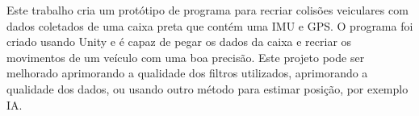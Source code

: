 Este trabalho cria um protótipo de programa para recriar colisões veiculares com dados coletados de uma caixa preta que contém uma IMU e GPS. O programa foi criado usando Unity e é capaz de pegar os dados da caixa e recriar os movimentos de um veículo com uma boa precisão. Este projeto pode ser melhorado aprimorando a qualidade dos filtros utilizados, aprimorando a qualidade dos dados, ou usando outro método para estimar posição, por exemplo IA.